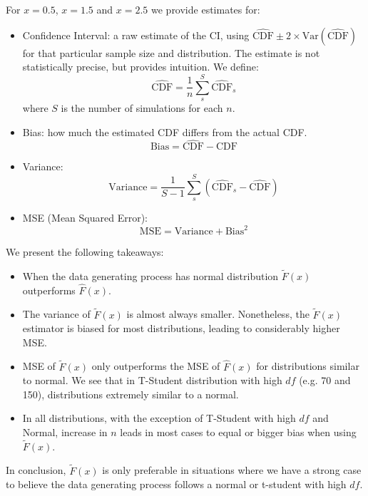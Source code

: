 \documentclass{article}
\begin{document}
For $x = 0.5$, $x = 1.5$ and $x = 2.5$ we provide estimates for:
\begin{itemize}
  \item Confidence Interval: a raw estimate of the CI, using $\hat{\text{CDF}} \pm 2 \times \text{Var}(\hat{\text{CDF}})$ for that particular sample size and distribution. The estimate is not statistically precise, but provides intuition.
  We define:
  $$
  \hat{\text{CDF}} = \frac{1}{n} \sum_s^{S} \hat{\text{CDF}}_s
  $$
  where $S$ is the number of simulations for each $n$.
  \item Bias: how much the estimated CDF differs from the actual CDF.
  $$
  \text{Bias} = \hat{\text{CDF}} - {\text{CDF}}
  $$
  \item Variance: 
  $$
  \text{Variance} = \frac{1}{S-1} \sum_s^{S} \left(\hat{\text{CDF}}_s - \hat{\text{CDF}}\right)
  $$
  \item MSE (Mean Squared Error): 
  $$
  \text{MSE} = \text{Variance} + \text{Bias}^2
  $$
\end{itemize}

We present the following takeaways:
\begin{itemize}
  \item When the data generating process has normal distribution $\tilde{F}(x)$ outperforms $\hat{F}(x)$.
  \item The variance of $\tilde{F}(x)$ is almost always smaller. Nonetheless, the  $\tilde{F}(x)$ estimator is biased for most distributions, leading to considerably higher MSE.
  \item MSE of $\tilde{F}(x)$ only outperforms the MSE of $\hat{F}(x)$ for distributions similar to normal. We see that in T-Student distribution with high $df$ (e.g. 70 and 150), distributions extremely similar to a normal.
  \item In all distributions, with the exception of T-Student with high $df$ and Normal, increase in $n$ leads in most cases to equal or bigger bias when using $\tilde{F}(x)$.
\end{itemize}

In conclusion, $\tilde{F}(x)$ is only preferable in situations where we have a strong case to believe the data generating process follows a normal or t-student with high $df$.
\end{document}
